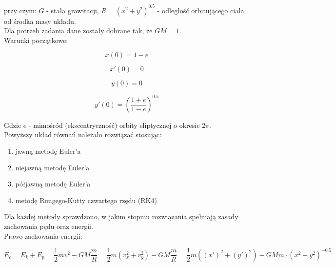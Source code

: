 \documentclass{article}
\begin{document}
	przy czym: $G$ - stała grawitacji, $R = (x^2+y^2)^{0.5}$ - odległość orbitującego ciała od środka masy układu. 
	\\

	Dla potrzeb zadania dane zostały dobrane tak, że $GM = 1$. 
	\\

	Warunki początkowe:

	\begin{equation}
		x(0) = 1-e
	\end{equation}

	\begin{equation}
		x'(0) = 0
	\end{equation}

	\begin{equation}
		y(0) = 0
	\end{equation}

	\begin{equation}
		y'(0) = \left( \frac{1+e}{1-e} \right)  ^ {0.5}
	\end{equation}

	Gdzie $e$ - mimośród (ekscentryczność) orbity eliptycznej o okresie $2\pi$.
	\\



	Powyższy układ równań należało rozwiązać stosując:

	\begin{enumerate}
		\item jawną metodę Euler'a
		\item niejawną metodę Euler'a
		\item półjawną metodę Euler'a
		\item metodę Rungego-Kutty czwartego rzędu (RK4)
	\end{enumerate}

	Dla każdej metody sprawdzono, w jakim stopniu rozwiązania spełniają zasady zachowania pędu oraz energii.
	\\

	Prawo zachowania energii:

	\begin{equation}
		E_c = E_k+E_p = \frac{1}{2} m v^2 - GM \frac{m}{R} = \frac{1}{2} m (v_x^2+v_y^2) - GM \frac{m}{R} = \frac{1}{2} m ((x')^2 + (y')^2) - GMm \cdot (x^2+y^2)^{-0.5}
	\end{equation}
	
	
	
\end{document}
